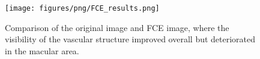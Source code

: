 \begin{figure}[h]
    \centering
    \texttt{[image: figures/png/FCE\_results.png]}
    \caption{Comparison of the original image and FCE image, where the visibility of the vascular structure improved overall but deteriorated in the macular area.}
    \label{fig:FCE_results}
\end{figure}